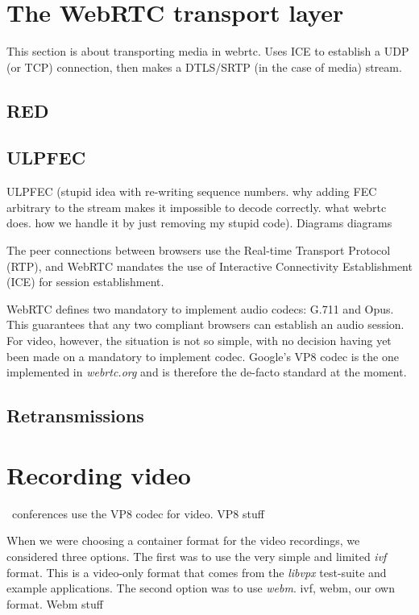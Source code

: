 \documentclass[twoside,openright,a4paper,11pt,english]{article}
\begin{document}
\section{The WebRTC transport layer}
This section is about transporting media in webrtc. Uses ICE to establish a
UDP (or TCP) connection, then makes a DTLS/SRTP (in the case of media) stream.
\subsection{RED}
\subsection{ULPFEC}
ULPFEC (stupid idea with re-writing sequence numbers. why adding FEC arbitrary to the stream makes it impossible to decode correctly. what webrtc does. how we handle it by just removing my stupid code). Diagrams
diagrams

\bigskip
The peer connections between browsers use the Real-time Transport Protocol (RTP\cite{rtp}), and WebRTC mandates the use of
Interactive Connectivity Establishment (ICE\cite{ice}) for session establishment.

WebRTC defines two mandatory to implement audio codecs: G.711\cite{g711} and
Opus\cite{opus, opusrtp}. This guarantees that any two compliant browsers can establish
an audio session. For video, however, the situation is not so simple, with no
decision having yet been made on a mandatory to implement codec. Google's VP8\cite{vp8}
codec is the one implemented in \emph{webrtc.org} and is therefore the de-facto
standard at the moment.


\subsection{Retransmissions}

\section{Recording video}
\jm\ conferences use the VP8 codec for video.
VP8 stuff

When we were choosing a container format for the video recordings, we considered three options.
The first was to use the very simple and limited \emph{ivf} format. This is a video-only format
that comes from the \emph{libvpx} test-suite and example applications. The second option was to use \emph{webm}.
ivf, webm, our own format.
Webm stuff
\end{document}
